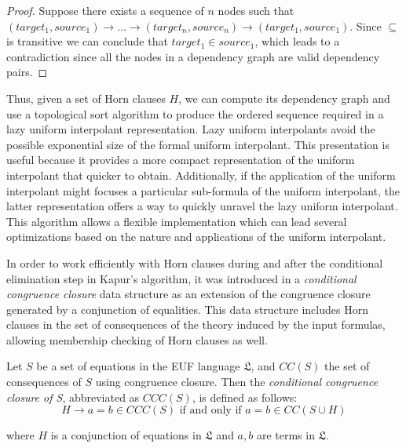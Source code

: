\begin{proof}
  Suppose there exists a sequence of $n$ nodes such that 
  $(target_1, source_1) \rightarrow \dots 
  \rightarrow (target_n, source_n) \rightarrow (target_1, source_1)$.
  Since $\subseteq$ is transitive we can conclude that 
  $target_1 \in source_1$, which leads to a contradiction since all
  the nodes in a dependency graph are valid dependency pairs.
\end{proof}

Thus, given a set of Horn clauses $H$, we can compute its
dependency graph and use a topological sort algorithm to 
produce the ordered sequence required in a lazy uniform 
interpolant representation. 
Lazy uniform interpolants avoid the 
possible exponential size of the 
formal uniform interpolant. This presentation 
is useful because it provides a more compact
representation of the uniform interpolant that 
quicker to obtain.
Additionally, if the application of the uniform interpolant 
might focuses a particular sub-formula of 
the uniform interpolant, the
latter representation offers a way to quickly unravel 
the lazy uniform interpolant. This algorithm 
allows a flexible implementation 
which can lead several optimizations
based on the nature and applications of the uniform 
interpolant.

In order to work efficiently with Horn clauses 
during and after the conditional elimination step
in Kapur's algorithm, it was 
introduced in \cite{KAPUR2019} a 
\emph{conditional congruence closure} data structure as 
an extension of the congruence closure
generated by a conjunction of equalities.
This data structure includes Horn clauses in the set
of consequences of the theory induced by
the input formulas, allowing membership checking 
of Horn clauses as well. 

\begin{definition}
  Let $S$ be a set of equations in the EUF language
  $\mathfrak{L}$, and
  $CC(S)$ the set of consequences of $S$ using congruence
  closure. Then the \emph{conditional congruence closure of S},
  abbreviated as $CCC(S)$,
  is defined as follows:
  \begin{equation*}
    H \rightarrow a = b \in CCC(S) \text{ if and only if } 
    a = b \in CC(S \cup H)
  \end{equation*}

  where $H$ is a conjunction of equations in $\mathfrak{L}$ 
  and $a,b$ are terms in $\mathfrak{L}$.
\end{definition}

